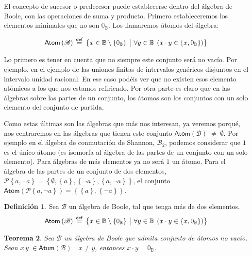 \documentclass[final,12pt,a4paper,twoside,fleqn]{extbook}
\newcommand{\mathdef}{\ensuremath{\stackrel{\mathsf{def}}{{}={}}}}
\newcommand{\set}[1]{\ensuremath{\left\lbrace{#1}\right\rbrace}}
\newcommand {\setCompr}[2]{
	\ensuremath{
		\left\lbrace{ 
			#1 {\;\big{\vert}\;} #2
        }\right\rbrace
    }
}
\newcommand{\setB}{\ensuremath{\mathbb{B}}}
\newcommand{\algB}{\ensuremath{\mathscr{B}}}
\newtheorem{thm}{Teorema}[chapter]
\theoremstyle{definition}
\newtheorem{defn}[thm]{Definición}
\theoremstyle{remark}
\begin{document}
	El concepto de sucesor o predecesor puede establecerse dentro del álgebra
de Boole, con las operaciones de suma y producto. Primero estableceremos los
elementos minimales que no son \(0_\setB\). Los llamaremos átomos del
álgebra:



\begin{equation}
\mathsf{Atom} \left( \algB \right) \mathdef \setCompr{x \in \setB \setminus
\set{0_\setB}}{ \forall y \in \setB \; \left( x \cdot y \in \set{x,0_\setB}
\right) }
\end{equation}



	Lo primero es tener en cuenta que no siempre este conjunto será no vacío.
Por ejemplo, en el ejemplo de las uniones finitas de intervalos genéricos
disjuntos en el intervalo unidad racional. En ese caso podéis ver que no
existen esos elemento atómicos a los que nos estamos refiriendo. Por otra
parte es claro que en las álgebras sobre las partes de un conjunto, los
átomos son los conjuntos con un solo elemento del conjunto de partida.



	Como estas últimas son las álgebras que más nos interesan, ya veremos
porqué, nos centraremos en las álgebras que tienen este conjunto
\(\mathsf{Atom}\left(\algB\right) \;\neq\; \emptyset\). Por ejemplo en el
álgebra de conmutación de Shannon, \(\algB_2\), podemos considerar que \(1\)
es el único átomo (es isomorfa al álgebra de las partes de un conjunto con un
solo elemento). Para álgebras de más elementos ya no será \(1\) un átomo.
Para el álgebra de las partes de un conjunto de dos elementos, \(\mathscr{P}
\set{a,\neg a} = \set{\emptyset, \set{a}, \set{\neg a}, \set{a,\neg a}}\), el
conjunto \(\mathsf{Atom}\left(\mathscr{P} \set{a,\neg
a}\right)=\set{\set{a},\set{\neg a}}\).



\begin{defn}
Sea \(\algB\) un álgebra de Boole, tal que tenga más de dos elementos.
\begin{equation}
  \mathsf{Atom}\left(\algB\right) \mathdef \setCompr{x \in \setB \setminus
  \set{0_\setB}} {\forall y \in \setB \; \left( x \cdot y \in \set{ x ,
  0_\setB } \right)}
\end{equation}
\end{defn}




\begin{thm}
Sea \(\algB\) un álgebra de Boole que admita conjunto de átomos no vacío.
Sean \(x \, y \; \in \mathsf{Atom}\left({\algB}\right)\quad x\neq y\),
entonces \(x \cdot y = 0_\setB\).
\end{thm}
\end{document}
